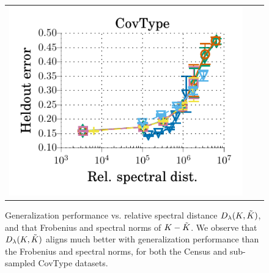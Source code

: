 \begin{figure}
\begin{tabular}{c c c}
		\includegraphics[width=0.4\linewidth]{figures/classification_acc_vs_delta_all_line.pdf} \\
	\end{tabular}
	\caption{Generalization performance vs. relative spectral distance $D_{\lambda}(K,\tilde{K})$, and that Frobenius and spectral norms of $K - \tilde{K}$. We observe that $D_{\lambda}(K,\tilde{K})$ aligns much better with generalization performance than the Frobenius and spectral norms, for both the Census and sub-sampled CovType datasets.}
	\label{fig:specdist_app}	

\end{figure}
